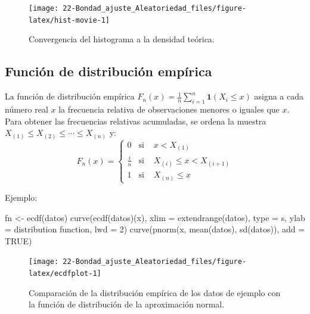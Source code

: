 \documentclass[
]{book}
\newenvironment{Shaded}{\begin{snugshade}}{\end{snugshade}}
\newcommand{\AttributeTok}[1]{\textcolor[rgb]{0.77,0.63,0.00}{#1}}
\newcommand{\ConstantTok}[1]{\textcolor[rgb]{0.00,0.00,0.00}{#1}}
\newcommand{\DecValTok}[1]{\textcolor[rgb]{0.00,0.00,0.81}{#1}}
\newcommand{\FunctionTok}[1]{\textcolor[rgb]{0.00,0.00,0.00}{#1}}
\newcommand{\NormalTok}[1]{#1}
\newcommand{\OtherTok}[1]{\textcolor[rgb]{0.56,0.35,0.01}{#1}}
\newcommand{\StringTok}[1]{\textcolor[rgb]{0.31,0.60,0.02}{#1}}
\theoremstyle{break}
\theoremstyle{definition}
\theoremstyle{definition}
\theoremstyle{definition}
\theoremstyle{definition}
\theoremstyle{remark}
\begin{document}
\begin{figure}[!htb]

{\centering \texttt{[image: 22-Bondad\_ajuste\_Aleatoriedad\_files/figure-latex/hist-movie-1]} 

}

\caption{Convergencia del histograma a la densidad teórica.}\label{fig:hist-movie}
\end{figure}

\hypertarget{empdistr}{%
\subsection{Función de distribución empírica}\label{empdistr}}

La función de distribución empírica \(F_n\left( x \right)=\frac{1}{n}\sum_{i=1}^{n}\mathbf{1}\left( X_i\leq x\right)\) asigna a cada número real \(x\) la frecuencia relativa de observaciones menores o iguales que \(x\).
Para obtener las frecuencias relativas acumuladas, se ordena la muestra \(X_{(1)}\leq X_{(2)}\leq \cdots \leq X_{(n)}\) y:
\[F_n(x)=\left \{
\begin{array}{cll}
0 & \text{si } &x<X_{\left(  1\right)  }\\
\tfrac{i}n & \text{si } & X_{\left(  i\right)  }\leq x<X_{\left(  i+1\right)  }\\
1 & \text{si } & X_{\left(  n\right)  }\leq x
\end{array}
\right.\]

Ejemplo:

\begin{Shaded}
\begin{Highlighting}[]
\NormalTok{fn }\OtherTok{\textless{}{-}} \FunctionTok{ecdf}\NormalTok{(datos)}
\FunctionTok{curve}\NormalTok{(}\FunctionTok{ecdf}\NormalTok{(datos)(x), }\AttributeTok{xlim =} \FunctionTok{extendrange}\NormalTok{(datos), }\AttributeTok{type =} \StringTok{\textquotesingle{}s\textquotesingle{}}\NormalTok{, }
      \AttributeTok{ylab =} \StringTok{\textquotesingle{}distribution function\textquotesingle{}}\NormalTok{, }\AttributeTok{lwd =} \DecValTok{2}\NormalTok{)}
\FunctionTok{curve}\NormalTok{(}\FunctionTok{pnorm}\NormalTok{(x, }\FunctionTok{mean}\NormalTok{(datos), }\FunctionTok{sd}\NormalTok{(datos)), }\AttributeTok{add =} \ConstantTok{TRUE}\NormalTok{)}
\end{Highlighting}
\end{Shaded}

\begin{figure}[!htb]

{\centering \texttt{[image: 22-Bondad\_ajuste\_Aleatoriedad\_files/figure-latex/ecdfplot-1]} 

}

\caption{Comparación de la distribución empírica de los datos de ejemplo con la función de distribución de la aproximación normal.}\label{fig:ecdfplot}
\end{figure}
\end{document}
